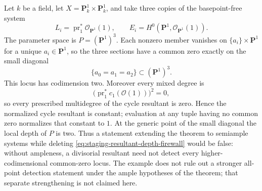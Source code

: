 \begin{example}\label{ex:staging-resultant-codimension-two-firewall}
Let \(k\) be a field, let
\(X=\mathbf P^1_k\times\mathbf P^1_k\), and take three copies of the
basepoint-free system
\[
 L_i=\operatorname{pr}_1^*\mathcal O_{\mathbf P^1}(1),
 \qquad
 E_i=H^0(\mathbf P^1,\mathcal O_{\mathbf P^1}(1)).
\]
The parameter space is \(P=(\mathbf P^1)^3\).  Each nonzero member vanishes
on \(\{a_i\}\times\mathbf P^1\) for a unique \(a_i\in\mathbf P^1\), so the
three sections have a common zero exactly on the small diagonal
\[
 \{a_0=a_1=a_2\}\subset(\mathbf P^1)^3.
\]
This locus has codimension two.  Moreover every mixed degree is
\[
 \bigl(\operatorname{pr}_1^*c_1(\mathcal O(1))\bigr)^2=0,
\]
so every prescribed multidegree of the cycle resultant is zero.  Hence the
normalized cycle resultant is constant; evaluation at any tuple having no
common zero normalizes that constant to \(1\).  At the generic point of
the small diagonal the local depth of \(P\) is two.  Thus a statement
extending the theorem to semiample systems while deleting
\eqref{eq:staging-resultant-depth-firewall} would be false: without
ampleness, a divisorial resultant need not detect every
higher-codimensional common-zero locus.  The example does not rule out a
stronger all-point detection statement under the ample hypotheses of the
theorem; that separate strengthening is not claimed here.
\end{example}
